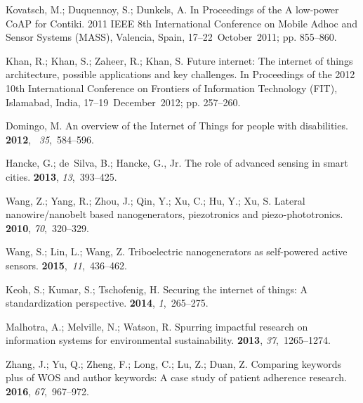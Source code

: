 \documentclass[symmetry,article,accept,moreauthors,pdftex10pt,a4paper]{mdpi}
\begin{document}
\begin{thebibliography}{999}
Kovatsch, M.; Duquennoy, S.; Dunkels, A.
\newblock In Proceedings of the A low-power CoAP for Contiki. 2011 IEEE 8th International Conference on Mobile Adhoc and Sensor Systems (MASS), Valencia, Spain, 17--22~October~2011;
\newblock  pp. 855--860.

Khan, R.; Khan, S.; Zaheer, R.; Khan, S.
\newblock Future internet: The internet of things architecture, possible
applications and key challenges. In Proceedings of the 2012 10th International Conference on Frontiers of Information Technology (FIT), Islamabad, India, 17--19~December~2012;
\newblock  pp. 257--260.

Domingo, M.
\newblock An overview of the Internet of Things for people with disabilities.
 {\bf 2012},~{\em
	35},~584--596.

Hancke, G.; de~Silva, B.; Hancke, G., Jr.
\newblock The role of advanced sensing in smart cities.
 {\bf 2013}, {\em 13},~393--425.

Wang, Z.; Yang, R.; Zhou, J.; Qin, Y.; Xu, C.; Hu, Y.; Xu, S.
\newblock Lateral nanowire/nanobelt based nanogenerators, piezotronics and
piezo-phototronics.
 {\bf 2010}, {\em
	70},~320--329.

Wang, S.; Lin, L.; Wang, Z.
\newblock Triboelectric nanogenerators as self-powered active sensors.
 {\bf 2015},~{\em 11},~436--462.

Keoh, S.; Kumar, S.; Tschofenig, H.
\newblock Securing the internet of things: A standardization perspective.
 {\bf 2014}, {\em 1},~265--275.

Malhotra, A.; Melville, N.; Watson, R.
\newblock Spurring impactful research on information systems for environmental
sustainability.
 {\bf 2013}, {\em
	37},~1265--1274.

Zhang, J.; Yu, Q.; Zheng, F.; Long, C.; Lu, Z.; Duan, Z.
\newblock Comparing keywords plus of WOS and author keywords: A case study of
patient adherence research.
 {\bf 2016}, {\em 67},~967--972.


\end{thebibliography}
\end{document}
